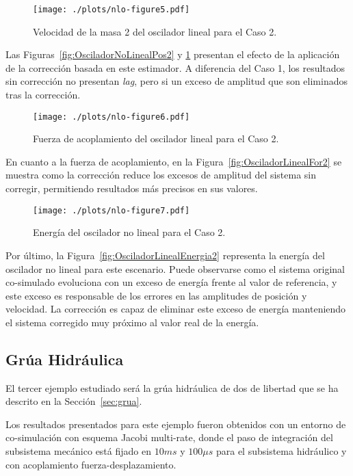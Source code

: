 \begin{figure}[ht!]\centering
	\texttt{[image: ./plots/nlo-figure5.pdf]}
	\caption{Velocidad de la masa 2 del oscilador lineal para el Caso 2.}
	\label{fig:OsciladorNoLinealVel2}
\end{figure}

Las Figuras~\ref{fig:OsciladorNoLinealPos2} y \ref{fig:OsciladorNoLinealVel2} presentan el efecto de la aplicación de la corrección basada en este estimador.
A diferencia del Caso 1, los resultados sin corrección no presentan \textit{lag}, pero si un exceso de amplitud que son eliminados tras la corrección.


\begin{figure}[ht!]\centering
	\texttt{[image: ./plots/nlo-figure6.pdf]}
	\caption{Fuerza de acoplamiento del oscilador lineal para el Caso 2.}
	\label{fig:OsciladorNoLinealFor2}
\end{figure}

En cuanto a la fuerza de acoplamiento, en la Figura~\ref{fig:OsciladorLinealFor2} se muestra como la corrección reduce los excesos de amplitud del sistema sin corregir, permitiendo resultados más precisos en sus valores.

\begin{figure}[ht!]\centering
	\texttt{[image: ./plots/nlo-figure7.pdf]}
	\caption{Energía del oscilador no lineal para el Caso 2.}
	\label{fig:OsciladorNoLinealEnergia2}
\end{figure}


Por último, la Figura~\ref{fig:OsciladorLinealEnergia2} representa la energía del oscilador no lineal para este escenario.
Puede observarse como el sistema original co-simulado evoluciona con un exceso de energía frente al valor de referencia, y este exceso es responsable de los errores en las amplitudes de posición y velocidad.
La corrección es capaz de eliminar este exceso de energía manteniendo el sistema corregido muy próximo al valor real de la energía.


\subsection{Grúa Hidráulica}
\label{sec:res_grua}

El tercer ejemplo estudiado será la grúa hidráulica de dos de libertad que se ha descrito en la Sección~\ref{sec:grua}. 

Los resultados presentados para este ejemplo fueron obtenidos con un entorno de co-simulación con esquema Jacobi multi-rate, donde el paso de integración del subsistema mecánico está fijado en $10\unit{ms}$ y $100\unit{\mu s}$ para el subsistema hidráulico y con acoplamiento fuerza-desplazamiento.

